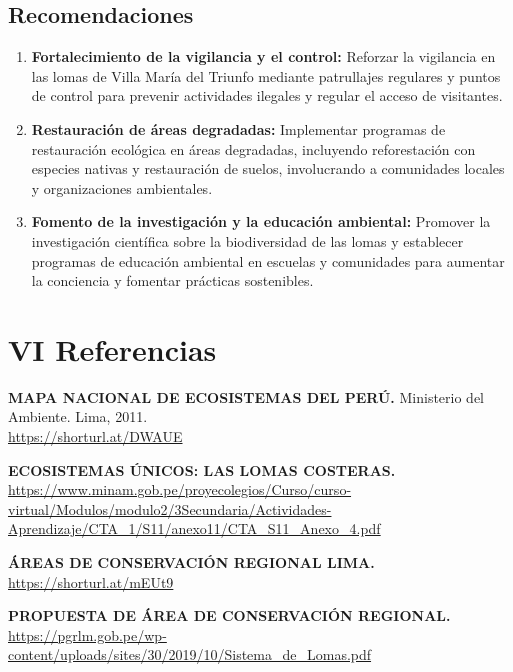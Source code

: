 \documentclass[a4paper,11pt]{article}
\begin{document}
\subsection{Recomendaciones}
\begin{enumerate}
  \item \textbf{Fortalecimiento de la vigilancia y el control:} Reforzar la vigilancia en las lomas de Villa María del Triunfo mediante patrullajes regulares y puntos de control para prevenir actividades ilegales y regular el acceso de visitantes.
  
  \item \textbf{Restauración de áreas degradadas:} Implementar programas de restauración ecológica en áreas degradadas, incluyendo reforestación con especies nativas y restauración de suelos, involucrando a comunidades locales y organizaciones ambientales.
  
  \item \textbf{Fomento de la investigación y la educación ambiental:} Promover la investigación científica sobre la biodiversidad de las lomas y establecer programas de educación ambiental en escuelas y comunidades para aumentar la conciencia y fomentar prácticas sostenibles.
  \end{enumerate}  
  
\newpage

\section*{VI Referencias}
\begin{enumerate}[label={[}\arabic*{]}]
  \item \textbf{MAPA NACIONAL DE ECOSISTEMAS DEL PERÚ.} Ministerio del Ambiente. Lima, 2011.\\
  \url{https://shorturl.at/DWAUE}

  \item \textbf{ECOSISTEMAS ÚNICOS: LAS LOMAS COSTERAS.}\\
  \url{https://www.minam.gob.pe/proyecolegios/Curso/curso-virtual/Modulos/modulo2/3Secundaria/Actividades-Aprendizaje/CTA_1/S11/anexo11/CTA_S11_Anexo_4.pdf}

  \item \textbf{ÁREAS DE CONSERVACIÓN REGIONAL LIMA.}\\
  \url{https://shorturl.at/mEUt9}

  \item \textbf{PROPUESTA DE ÁREA DE CONSERVACIÓN REGIONAL.}\\
  \url{https://pgrlm.gob.pe/wp-content/uploads/sites/30/2019/10/Sistema_de_Lomas.pdf}
  
\end{enumerate}
\end{document}
